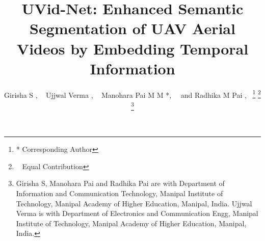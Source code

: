 \documentclass[journal]{IEEEtran}
\begin{document}
\title{UVid-Net: Enhanced Semantic Segmentation of UAV Aerial Videos by Embedding Temporal Information}


\author{Girisha S , ~
         Ujjwal Verma , ~
        Manohara Pai M M *,~
        ~and Radhika M Pai ,~ \thanks{* Corresponding Author}
\thanks{\dag ~ Equal Contribution}
\thanks{Girisha S, Manohara Pai and Radhika Pai are with Department of Information and Communication Technology, Manipal Institute of Technology, Manipal Academy of Higher Education, Manipal, India. Ujjwal Verma is with Department of Electronics and Communication Engg, Manipal Institute of Technology, Manipal Academy of Higher Education, Manipal, India.}}



















\maketitle
\end{document}
